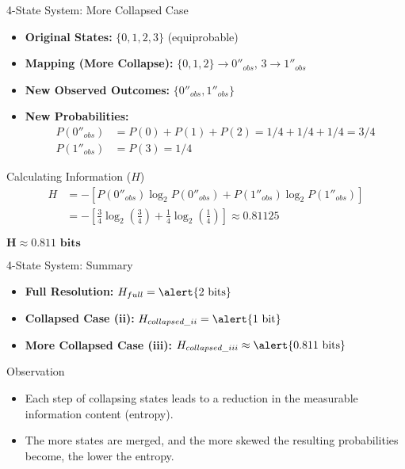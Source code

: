 \documentclass{beamer}
\begin{document}
\begin{frame}{4-State System: More Collapsed Case}
    \begin{itemize}
        \item \textbf{Original States:} $\{0, 1, 2, 3\}$ (equiprobable)
        \item \textbf{Mapping (More Collapse):}
                 $\{0, 1, 2\} \rightarrow 0''_{obs}$,
                $3 \rightarrow 1''_{obs}$
        \item \textbf{New Observed Outcomes:} $\{0''_{obs}, 1''_{obs}\}$
        \item \textbf{New Probabilities:}
            \begin{align*}
                P(0''_{obs}) &= P(0) + P(1) + P(2) = 1/4 + 1/4 + 1/4 = 3/4 \\
                P(1''_{obs}) &= P(3) = 1/4
            \end{align*}
    \end{itemize}
    \pause
    \begin{block}{Calculating Information ($H$)}
        \begin{align*}
            H &= - \left[ P(0''_{obs}) \log_2 P(0''_{obs}) + P(1''_{obs}) \log_2 P(1''_{obs}) \right] \\
            &= - \left[ \frac{3}{4} \log_2 \left(\frac{3}{4}\right) + \frac{1}{4} \log_2 \left(\frac{1}{4}\right) \right]
             \approx 0.81125
        \end{align*}
        \begin{center}
            $\boldsymbol{H \approx 0.811 \text{ bits}}$
        \end{center}
    \end{block}
\end{frame}

\begin{frame}{4-State System: Summary}
    \begin{itemize}
        \item \textbf{Full Resolution:} $H_{full} = \alert{2 \text{ bits}}$
        \item \textbf{Collapsed Case (ii):} $H_{collapsed\_ii} = \alert{1 \text{ bit}}$
        \item \textbf{More Collapsed Case (iii):} $H_{collapsed\_iii} \approx \alert{0.811 \text{ bits}}$
    \end{itemize}
    \pause
    \begin{block}{Observation}
        \begin{itemize}
            \item Each step of collapsing states leads to a \alert{reduction} in the measurable information content (entropy).
            \item The more states are merged, and the more skewed the resulting probabilities become, the lower the entropy.
        \end{itemize}
    \end{block}
\end{frame}
\end{document}

